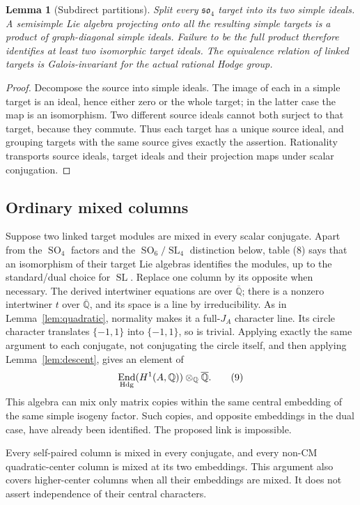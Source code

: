 \documentclass[11pt]{article}
\newcommand{\Q}{\mathbb Q}
\newcommand{\kk}{{\overline{\mathbb Q}}}
\DeclareMathOperator{\End}{End}
\DeclareMathOperator{\SL}{SL}
\DeclareMathOperator{\SO}{SO}
\newtheorem{lemma}[theorem]{Lemma}
\theoremstyle{remark}
\begin{document}
\begin{lemma}[Subdirect partitions]\label{lem:graphs}
Split every $\mathfrak{so}_4$ target into its two simple ideals.
A semisimple Lie algebra projecting onto all the resulting simple
targets is a product of graph-diagonal simple ideals. Failure to be
the full product therefore identifies at least two isomorphic
target ideals. The equivalence relation of linked targets is
Galois-invariant for the actual rational Hodge group.
\end{lemma}
\begin{proof}
Decompose the source into simple ideals. The image of each in a
simple target is an ideal, hence either zero or the whole target;
in the latter case the map is an isomorphism. Two different source
ideals cannot both surject to that target, because they commute.
Thus each target has a unique source ideal, and grouping targets
with the same source gives exactly the assertion. Rationality
transports source ideals, target ideals and their projection maps
under scalar conjugation.
\end{proof}

\subsection{Ordinary mixed columns}

Suppose two linked target modules are mixed in every scalar
conjugate. Apart from the $\SO_4$ factors and the
$\SO_6/\SL_4$ distinction below, table (8) says that an isomorphism
of their target Lie algebras identifies the modules, up to the
standard/dual choice for $\SL$. Replace one column by its opposite
when necessary. The derived intertwiner equations are over $\kk$;
there is a nonzero intertwiner $t$ over $\kk$, and its space is a
line by irreducibility. As in Lemma~\ref{lem:quadratic}, normality
makes it a full-$J_A$ character line. Its circle character translates
$\{-1,1\}$ into $\{-1,1\}$, so is trivial. Applying exactly the
same argument to each conjugate, not conjugating the circle itself,
and then applying Lemma~\ref{lem:descent}, gives an element of
\[
 \End_{\rm Hdg}(H^1(A,\Q))\otimes_\Q\kk.
 \tag{9}
\]
This algebra can mix only matrix copies within the same central
embedding of the same simple isogeny factor. Such copies, and
opposite embeddings in the dual case, have already been identified.
The proposed link is impossible.

Every self-paired column is mixed in every conjugate, and every
non-CM quadratic-center column is mixed at its two embeddings.
This argument also covers higher-center columns when all their
embeddings are mixed. It does not assert independence of their
central characters.
\end{document}
